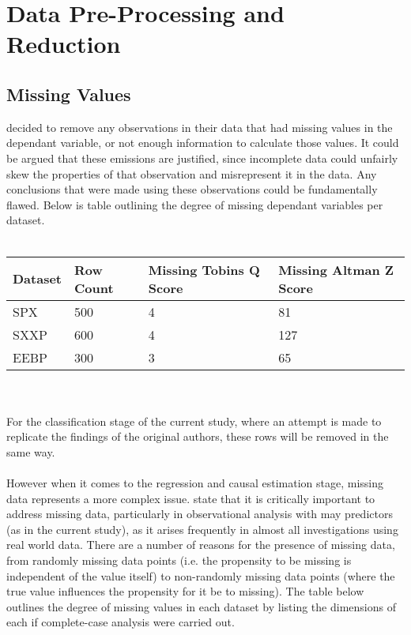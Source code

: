 \section{Data Pre-Processing and Reduction}
\subsection{Missing Values}\label{MissingValues}
{\cite{moldovan2015learning} decided to remove any observations in their data that had missing values in the dependant variable, or not enough information to calculate those values. It could be argued that these emissions are justified, since incomplete data could unfairly skew the properties of that observation and misrepresent it in the data. Any conclusions that were made using these observations could be fundamentally flawed. Below is table outlining the degree of missing dependant variables per dataset. 
\\\\
\begin{tabular}{ |p{3cm}||p{3cm}|p{3cm}|p{3cm}|  }
 \hline
 Dataset & Row Count & Missing Tobins Q Score & Missing Altman Z Score\\
 \hline
 SPX & 500 & 4  & 81 \\
 SXXP &   600  & 4  & 127 \\
 EEBP & 300 & 3 &  65 \\
 \hline
\end{tabular}\\\\
For the classification stage of the current study, where an attempt is made to replicate the findings of the original authors, these rows will be removed in the same way. \\\\
However when it comes to the regression and causal estimation stage, missing data represents a more complex issue. \cite{hortonMissing} state that it is critically important to address missing data, particularly in observational analysis with may predictors (as in the current study), as it arises frequently in almost all investigations using real world data. There are a number of reasons for the presence of missing data, from randomly missing data points (i.e. the propensity to be missing is independent of the value itself) to non-randomly missing data points (where the true value influences the propensity for it be to missing). The table below outlines the degree of missing values in each dataset by listing the dimensions of each if complete-case analysis were carried out. \\
}
